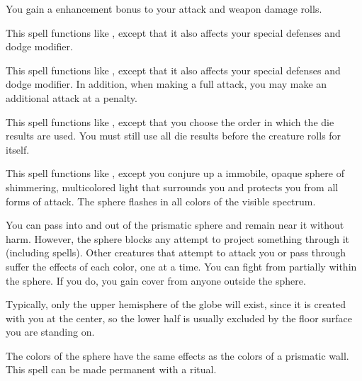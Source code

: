 \spelldur{\durshort \dismissable}
\spelleffect You gain a  enhancement bonus to your attack and weapon damage rolls. \spellbonusscalingdescription

\spelleffect This spell functions like , except that it also affects your special defenses and dodge modifier.

\spelleffect This spell functions like , except that it also affects your special defenses and dodge modifier. In addition, when making a full attack, you may make an additional attack at a  penalty.

\spelleffect This spell functions like , except that you choose the order in which the die results are used. You must still use all die results before the creature rolls for itself.

\spelleffect This spell functions like , except you conjure up a \areasmall immobile, opaque sphere of shimmering, multicolored light that surrounds you and protects you from all forms of attack. The sphere flashes in all colors of the visible spectrum. 
\par You can pass into and out of the prismatic sphere and remain near it without harm. However, the sphere blocks any attempt to project something through it (including spells). Other creatures that attempt to attack you or pass through suffer the effects of each color, one at a time. You can fight from partially within the sphere. If you do, you gain cover from anyone outside the sphere.
\par Typically, only the upper hemisphere of the globe will exist, since it is created with you at the center, so the lower half is usually excluded by the floor surface you are standing on.
\par The colors of the sphere have the same effects as the colors of a prismatic wall.
\spellnotes This spell can be made permanent with a  ritual.


